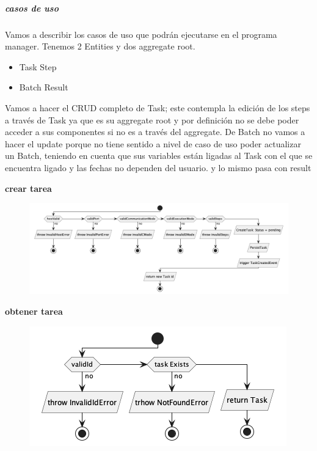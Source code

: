 \subparagraph{casos de uso}

Vamos a describir los casos de uso que podrán ejecutarse en el programa manager. Tenemos 2 Entities y dos aggregate root.

\begin{itemize}
    \item Task
    \subitem Step
    \item Batch
    \subitem Result
\end{itemize}

Vamos a hacer el CRUD completo de Task; este contempla la edición de los steps a través de Task ya que es su aggregate root y por definición no se debe poder acceder a sus componentes si no es a través del aggregate. De Batch no vamos a hacer el update porque no tiene sentido a nivel de caso de uso poder actualizar un Batch, teniendo en cuenta que sus variables están ligadas al Task con el que se encuentra ligado y las fechas no dependen del usuario. y lo mismo pasa con result


\textbf{crear tarea}

\begin{figure}[H]
    \centering
    \includegraphics[height=0.2\textheight]{./part/Proyecto_ejecutivo/memoria_descriptiva/descripcionDelProyecto/manager/uml/createTaskUseCase}
    \caption[Diagrama de objetos de dominio]{}\label{fig:createTaskUseCase}
\end{figure}

\textbf{obtener tarea}

\begin{figure}[H]
    \centering
    \includegraphics[height=0.2\textheight]{./part/Proyecto_ejecutivo/memoria_descriptiva/descripcionDelProyecto/manager/uml/getTaskUseCase}
    \caption[Diagrama de objetos de dominio]{}\label{fig:getTaskUseCase}
\end{figure}

